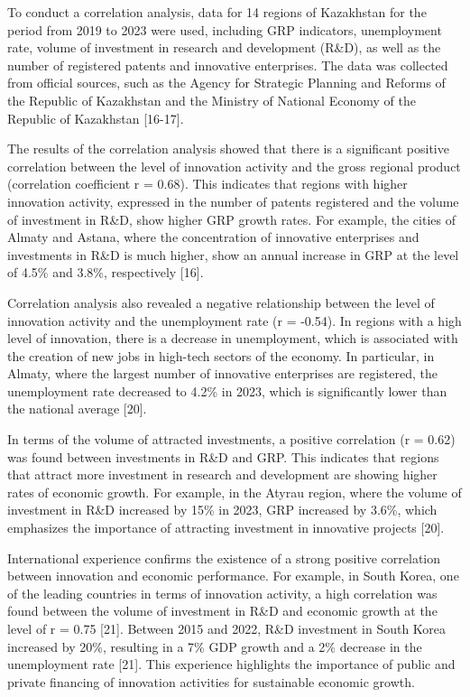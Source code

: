 \begin{multicols}{2}
To conduct a correlation analysis, data for 14 regions of Kazakhstan for
the period from 2019 to 2023 were used, including GRP indicators,
unemployment rate, volume of investment in research and development
(R\&D), as well as the number of registered patents and innovative
enterprises. The data was collected from official sources, such as the
Agency for Strategic Planning and Reforms of the Republic of Kazakhstan
and the Ministry of National Economy of the Republic of Kazakhstan
{[}16-17{]}.

The results of the correlation analysis showed that there is a
significant positive correlation between the level of innovation
activity and the gross regional product (correlation coefficient r =
0.68). This indicates that regions with higher innovation activity,
expressed in the number of patents registered and the volume of
investment in R\&D, show higher GRP growth rates. For example, the
cities of Almaty and Astana, where the concentration of innovative
enterprises and investments in R\&D is much higher, show an annual
increase in GRP at the level of 4.5\% and 3.8\%, respectively {[}16{]}.

Correlation analysis also revealed a negative relationship between the
level of innovation activity and the unemployment rate (r = -0.54). In
regions with a high level of innovation, there is a decrease in
unemployment, which is associated with the creation of new jobs in
high-tech sectors of the economy. In particular, in Almaty, where the
largest number of innovative enterprises are registered, the
unemployment rate decreased to 4.2\% in 2023, which is significantly
lower than the national average {[}20{]}.

In terms of the volume of attracted investments, a positive correlation
(r = 0.62) was found between investments in R\&D and GRP. This indicates
that regions that attract more investment in research and development
are showing higher rates of economic growth. For example, in the Atyrau
region, where the volume of investment in R\&D increased by 15\% in
2023, GRP increased by 3.6\%, which emphasizes the importance of
attracting investment in innovative projects {[}20{]}.

International experience confirms the existence of a strong positive
correlation between innovation and economic performance. For example, in
South Korea, one of the leading countries in terms of innovation
activity, a high correlation was found between the volume of investment
in R\&D and economic growth at the level of r = 0.75 {[}21{]}. Between
2015 and 2022, R\&D investment in South Korea increased by 20\%,
resulting in a 7\% GDP growth and a 2\% decrease in the unemployment
rate {[}21{]}. This experience highlights the importance of public and
private financing of innovation activities for sustainable economic
growth.


\end{multicols}
